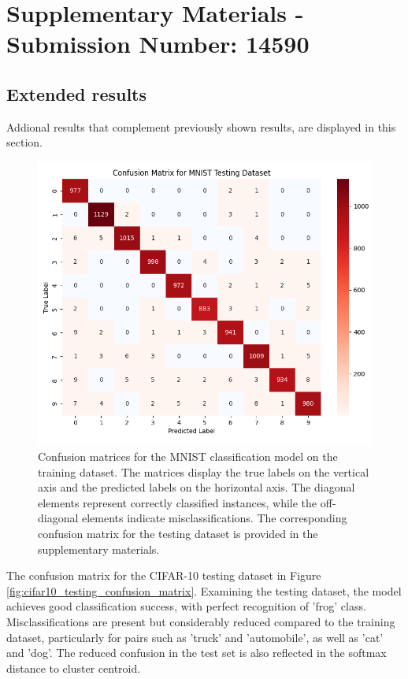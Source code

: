 
\clearpage
\section{Supplementary Materials - Submission Number: 14590}

\subsection{Extended results}

Addional results that complement previously shown results, are displayed in this section.

\begin{figure}[ht]
    \centering
    \includegraphics[width=0.99\columnwidth]{Figures/mnist_testing_confusion_matrix.png}
    \caption{Confusion matrices for the MNIST classification model on the training dataset. The matrices display the true labels on the vertical axis and the predicted labels on the horizontal axis. The diagonal elements represent correctly classified instances, while the off-diagonal elements indicate misclassifications. The corresponding confusion matrix for the testing dataset is provided in the supplementary materials.}
    \label{fig:mnist_testing_confusion_matrix}
\end{figure}

The confusion matrix for the CIFAR-10 testing dataset in Figure \ref{fig:cifar10_testing_confusion_matrix}. Examining the testing dataset, the model achieves good classification success, with perfect recognition of 'frog' class. Misclassifications are present but considerably reduced compared to the training dataset, particularly for pairs such as 'truck' and 'automobile', as well as 'cat' and 'dog'. The reduced confusion in the test set is also reflected in the softmax distance to cluster centroid.

